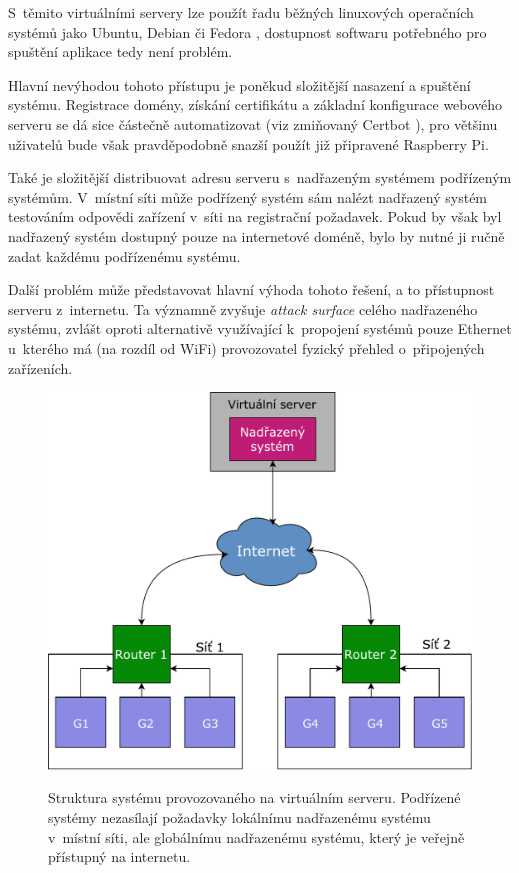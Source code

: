 S~těmito virtuálními servery lze použít řadu běžných linuxových operačních systémů jako Ubuntu, Debian či Fedora \cite{digi_droplets}, dostupnost softwaru potřebného pro spuštění aplikace tedy není problém.

Hlavní nevýhodou tohoto přístupu je poněkud složitější nasazení a spuštění systému. Registrace domény, získání certifikátu a základní konfigurace webového serveru se dá sice částečně automatizovat (viz zmiňovaný Certbot \cite{certbot}), pro většinu uživatelů bude však pravděpodobně snazší použít již připravené Raspberry Pi.

Také je složitější distribuovat adresu serveru s~nadřazeným systémem podřízeným systémům. V~místní síti může podřízený systém sám nalézt nadřazený systém testováním odpovědi zařízení v~síti na registrační požadavek. Pokud by však byl nadřazený systém dostupný pouze na internetové doméně, bylo by nutné ji ručně zadat každému podřízenému systému.

Další problém může představovat hlavní výhoda tohoto řešení, a to přístupnost serveru z~internetu. Ta významně zvyšuje \textit{attack surface} celého nadřazeného systému, zvlášt oproti alternativě využívající k~propojení systémů pouze Ethernet u~kterého má (na rozdíl od WiFi) provozovatel fyzický přehled o~připojených zařízeních.

\begin{figure}[h!]
    \centering
    \includegraphics[width=\textwidth]{images/aws.pdf}
    \label{fig:aws}
    \caption[Struktura systému provozovaného na virtuálním serveru]{Struktura systému provozovaného na virtuálním serveru. Podřízené systémy nezasílají požadavky lokálnímu nadřazenému systému v~místní síti, ale globálnímu nadřazenému systému, který je veřejně přístupný na internetu.}
\end{figure}